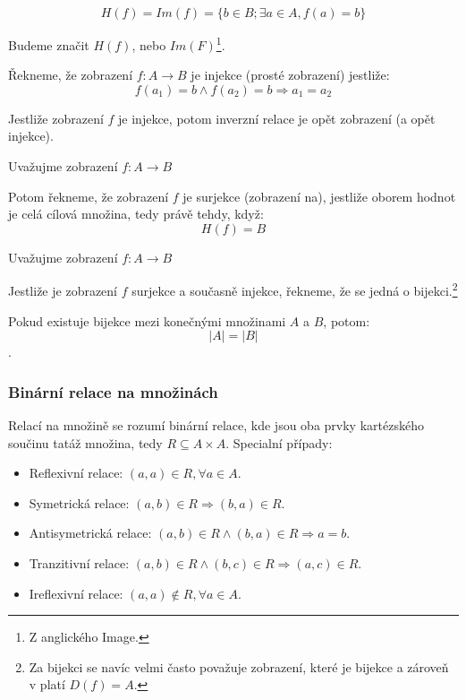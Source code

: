 \begin{definition}
	$$H(f) = Im(f) = \{b \in B; \exists a \in A, f(a) = b\}$$

	Budeme značit $H(f)$, nebo $Im(F)$\footnote{Z anglického Image.}.
\end{definition}

\begin{definition}
	Řekneme, že zobrazení $f: A \rightarrow B$ je injekce (prosté zobrazení)
	jestliže: $$f(a_1) = b \wedge f(a_2) = b \Rightarrow a_1 = a_2$$

	Jestliže zobrazení $f$ je injekce,
	potom inverzní relace je opět zobrazení (a opět injekce).
\end{definition}

\begin{definition}[Surjekce]
	Uvažujme zobrazení $f: A \rightarrow B$

	Potom řekneme, že zobrazení $f$ je surjekce (zobrazení na),
	jestliže oborem hodnot je celá cílová množina, tedy právě tehdy, když:
	$$H(f) = B$$
\end{definition}

\begin{definition}[Bijekce]
	Uvažujme zobrazení $f: A \rightarrow B$

	Jestliže je zobrazení $f$ surjekce a současně injekce,
	řekneme, že se jedná o bijekci.\footnote{Za bijekci se navíc velmi
	často považuje zobrazení, které je bijekce a zároveň v platí $D(f) = A$.}

	Pokud existuje bijekce mezi konečnými množinami $A$ a $B$, potom:
	$$|A| = |B|$$.
\end{definition}

\subsubsection*{Binární relace na množinách}
Relací na množině se rozumí binární relace, kde jsou oba prvky kartézského součinu tatáž
množina, tedy $R \subseteq A \times A$.
Specialní případy:
\begin{itemize}
	\item Reflexivní relace: $(a, a) \in R, \forall a \in A$.
	\item Symetrická relace: $(a, b) \in R \Rightarrow (b, a) \in R$.
	\item Antisymetrická relace: $(a, b) \in R \wedge (b, a) \in R \Rightarrow a = b$.
	\item Tranzitivní relace: $(a, b) \in R \wedge (b, c) \in R \Rightarrow (a, c) \in R$.
	\item Ireflexivní relace: $(a, a) \notin R, \forall a \in A$.
\end{itemize}

